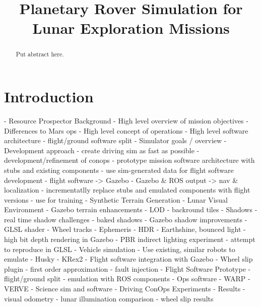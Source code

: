 \documentclass[twocolumn,letterpaper]{IEEEAerospaceCLS}  %
\begin{document}
\title{Planetary Rover Simulation for Lunar Exploration Missions}

\author{%
}

\maketitle

\thispagestyle{plain}
\pagestyle{plain}

\maketitle

\thispagestyle{plain}
\pagestyle{plain}

\begin{abstract}

Put abstract here.

\end{abstract}


\tableofcontents

\section{Introduction}


- Resource Prospector Background
  - High level overview of mission objectives
  - Differences to Mars ops
  - High level concept of operations
  - High level software architecture
    - flight/ground software split
- Simulator goals / overview
  - Development approach
    - create driving sim as fast as possible
      - development/refinement of conops
    - prototype mission software architecture with stubs and existing components
    - use sim-generated data for flight software development
      - flight software -> Gazebo
      - Gazebo & ROS output -> nav & localization
    - incrementatlly replace stubs and emulated components with flight versions
    - use for training
- Synthetic Terrain Generation
- Lunar Visual Environment
  - Gazebo terrain enhancements
    - LOD
    - backround tiles
  - Shadows
    - real time shadow challenges 
    - baked shadows
    - Gazebo shadow improvements
  - GLSL shader
  - Wheel tracks
  - Ephemeris
  - HDR
    - Earthshine, bounced light
    - high bit depth rendering in Gazebo
    - PBR indirect lighting experiment 
    - attempt to reproduce in GLSL 
- Vehicle simulation
  - Use existing, similar robots to emulate 
    - Husky
    - KRex2
  - Flight software integration with Gazebo
  - Wheel slip plugin
    - first order approximation
    - fault injection
- Flight Software Prototype
  - flight/ground split
  - emulation with ROS components
  - Ops software
    - WARP
    - VERVE
  - Science sim and software
- Driving ConOps Experiments
- Results
  - visual odometry
  - lunar illumination comparison 
  - wheel slip results
  
\end{document}
